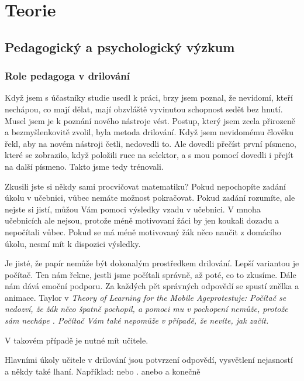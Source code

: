 \chapter{Teorie}

\section{Pedagogický a psychologický výzkum}

\subsection{Role pedagoga v drilování}

Když jsem s účastníky studie usedl k práci, brzy jsem poznal, že nevidomí, kteří nechápou, co mají dělat, mají obzvláště vyvinutou schopnost sedět bez hnutí.  Musel jsem je k poznání nového nástroje vést.  Postup, který jsem zcela přirozeně a bezmyšlenkovitě zvolil, byla metoda drilování.  Když jsem nevidomému člověku řekl, aby na novém nástroji četli, nedovedli to.  Ale dovedli přečíst první písmeno, které se zobrazilo, když položili ruce na selektor, a s mou pomocí dovedli i přejít na další písmeno.  Takto jsme tedy trénovali.

Zkusili jste si někdy sami procvičovat matematiku?  Pokud nepochopíte zadání úkolu v učebnici, vůbec nemáte možnost pokračovat.  Pokud zadání rozumíte, ale nejste si jistí, můžou Vám pomoci výsledky vzadu v učebnici.  V mnoha učebnicích ale nejsou, protože méně motivovaní žáci by jen koukali dozadu a nepočítali vůbec.  Pokud se má méně motivovaný žák něco naučit z domácího úkolu, nesmí mít k dispozici výsledky.

Je jisté, že papír nemůže být dokonalým prostředkem drilování.  Lepší variantou je počítač.  Ten nám řekne, jestli jsme počítali správně, až poté, co to zkusíme.  Dále nám dává emoční podporu.  Za každých pět správných odpovědí se spustí znělka a animace. Taylor v \em Theory of Learning for the Mobile Age\em protestuje: Počítač se nedozví, že žák něco špatně pochopil, a pomoci mu v pochopení nemůže, protože sám nechápe \citep{taylor2010theory}. Počítač Vám také nepomůže v případě, že nevíte, jak začít.

V takovém případě je nutné mít učitele.

Hlavními úkoly učitele v drilování jsou potvrzení odpovědí, vysvětlení nejasností a někdy také lhaní.  Například:  nebo .  anebo  a konečně 


